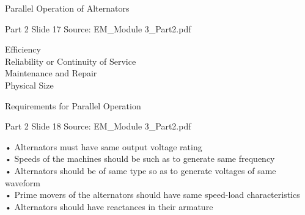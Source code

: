 \documentclass[11pt,a4paper]{article}
\begin{document}
\begin{mdframed}[roundcorner=9pt,backgroundcolor=white,linecolor=anthOrange,linewidth=1pt,innerleftmargin=12pt,innerrightmargin=12pt,innertopmargin=10pt,innerbottommargin=10pt,skipabove=8pt,skipbelow=10pt]
{\HeadingFont\fontsize{15}{18}\selectfont\color{anthDark}Parallel Operation of Alternators\par}
{\color{anthMid}\small Part 2 \textbullet{} Slide 17 \textbullet{} Source: EM\_Module 3\_Part2.pdf\par}
\vspace{0.5em}
{\small
\smallskip
Efficiency\\
Reliability or Continuity of Service\\
Maintenance and Repair\\
Physical Size\\

}
\end{mdframed}

\begin{mdframed}[roundcorner=9pt,backgroundcolor=white,linecolor=anthBlue,linewidth=1pt,innerleftmargin=12pt,innerrightmargin=12pt,innertopmargin=10pt,innerbottommargin=10pt,skipabove=8pt,skipbelow=10pt]
{\HeadingFont\fontsize{15}{18}\selectfont\color{anthDark}Requirements for Parallel Operation\par}
{\color{anthMid}\small Part 2 \textbullet{} Slide 18 \textbullet{} Source: EM\_Module 3\_Part2.pdf\par}
\vspace{0.5em}
{\small
\smallskip
• Alternators must have same output voltage rating\\
• Speeds of the machines should be such as to generate same frequency\\
• Alternators should be of same type so as to generate voltages of same waveform\\
• Prime movers of the alternators should have same speed-load characteristics\\
• Alternators should have reactances in their armature\\

}
\end{mdframed}
\end{document}
